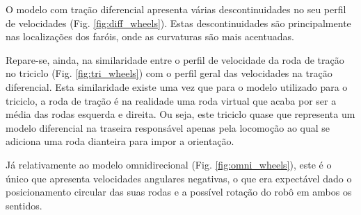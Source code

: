 \documentclass{article}
\begin{document}
O modelo com tração diferencial apresenta várias descontinuidades no seu perfil de velocidades (Fig. \ref{fig:diff_wheels}). Estas descontinuidades são principalmente nas localizações dos faróis, onde as curvaturas são mais acentuadas.

Repare-se, ainda, na similaridade entre o perfil de velocidade da roda de tração no triciclo (Fig. \ref{fig:tri_wheels}) com o perfil geral das velocidades na tração diferencial. Esta similaridade existe uma vez que para o modelo utilizado para o triciclo, a roda de tração é na realidade uma roda virtual que acaba por ser a média das rodas esquerda e direita. Ou seja, este triciclo quase que representa um modelo diferencial na traseira responsável apenas pela locomoção ao qual se adiciona uma roda dianteira para impor a orientação.

Já relativamente ao modelo omnidirecional (Fig. \ref{fig:omni_wheels}), este é o único que apresenta velocidades angulares negativas, o que era expectável dado o posicionamento circular das suas rodas e a possível rotação do robô em ambos os sentidos.
\end{document}
